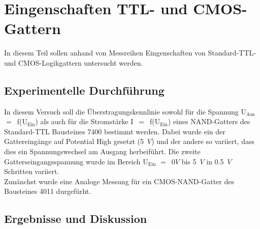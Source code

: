 \section{Eingenschaften TTL- und CMOS-Gattern}
In diesem Teil sollen anhand von Messreihen Eingenschaften von Standard-TTL- und CMOS-Logikgattern untersucht werden.

\subsection{Experimentelle Durchf\"uhrung}
In diesem Versuch soll die \"Uberstragungskennlinie sowohl f\"ur die Spannung U$_{\text{Aus}}$~$=$~f(U$_{\text{Ein}}$) als auch f\"ur die Stromst\"arke I~$=$~f(U$_{\text{Ein}}$) eines NAND-Gatters des Standard-TTL Bausteines 7400 bestimmt werden. Dabei wurde ein der Gattereing\"ange auf Potential High gesetzt (5~$V$) und der andere so variiert, dass dies ein Spannungswechsel am Ausgang herbeif\"uhrt. Die zweite Gatterseingangsspannung wurde im Bereich U$_{\text{Ein}}$ $=$~0$V$ bis 5~$V$ in 0.5~$V$ Schritten variiert.\\
Zun\"anchst wurde eine Analoge Messung f\"ur ein CMOS-NAND-Gatter des Bausteines 4011 durgef\"urht.
\subsection{Ergebnisse und Diskussion}
